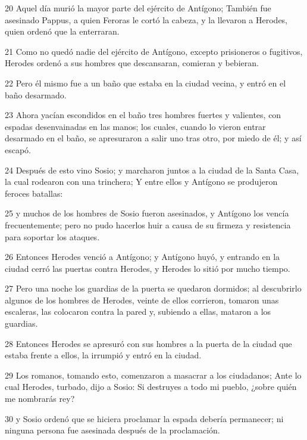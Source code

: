\par 20 Aquel día murió la mayor parte del ejército de Antígono; También fue asesinado Pappus, a quien Feroras le cortó la cabeza, y la llevaron a Herodes, quien ordenó que la enterraran.

\par 21 Como no quedó nadie del ejército de Antígono, excepto prisioneros o fugitivos, Herodes ordenó a sus hombres que descansaran, comieran y bebieran.

\par 22 Pero él mismo fue a un baño que estaba en la ciudad vecina, y entró en el baño desarmado.

\par 23 Ahora yacían escondidos en el baño tres hombres fuertes y valientes, con espadas desenvainadas en las manos; los cuales, cuando lo vieron entrar desarmado en el baño, se apresuraron a salir uno tras otro, por miedo de él; y así escapó.

\par 24 Después de esto vino Sosio; y marcharon juntos a la ciudad de la Santa Casa, la cual rodearon con una trinchera; Y entre ellos y Antígono se produjeron feroces batallas:

\par 25 y muchos de los hombres de Sosio fueron asesinados, y Antígono los vencía frecuentemente; pero no pudo hacerlos huir a causa de su firmeza y resistencia para soportar los ataques.

\par 26 Entonces Herodes venció a Antígono; y Antígono huyó, y entrando en la ciudad cerró las puertas contra Herodes, y Herodes lo sitió por mucho tiempo.

\par 27 Pero una noche los guardias de la puerta se quedaron dormidos; al descubrirlo algunos de los hombres de Herodes, veinte de ellos corrieron, tomaron unas escaleras, las colocaron contra la pared y, subiendo a ellas, mataron a los guardias.

\par 28 Entonces Herodes se apresuró con sus hombres a la puerta de la ciudad que estaba frente a ellos, la irrumpió y entró en la ciudad.

\par 29 Los romanos, tomando esto, comenzaron a masacrar a los ciudadanos; Ante lo cual Herodes, turbado, dijo a Sosio: Si destruyes a todo mi pueblo, ¿sobre quién me nombrarás rey?

\par 30 y Sosio ordenó que se hiciera proclamar la espada debería permanecer; ni ninguna persona fue asesinada después de la proclamación.

